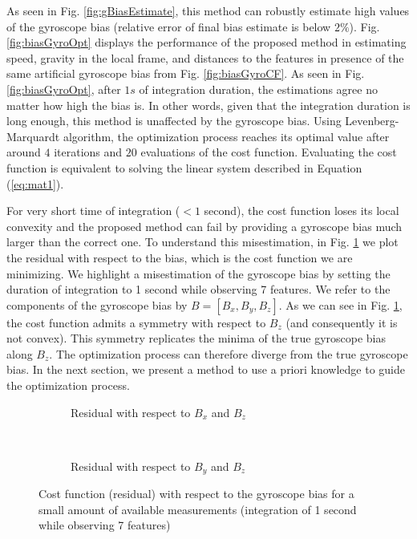 \documentclass[letterpaper, 10 pt, journal, twoside]{IEEEtran}  %
\begin{document}
As seen in Fig. \ref{fig:gBiasEstimate}, this method can robustly estimate high values of the gyroscope bias (relative error of final bias estimate is below $2\%$).
Fig. \ref{fig:biasGyroOpt} displays the performance of the proposed method in estimating speed, gravity in the local frame, and distances to the features in presence of the same artificial gyroscope bias from Fig. \ref{fig:biasGyroCF}.
As seen in Fig. \ref{fig:biasGyroOpt}, after $1s$ of integration duration, the estimations agree no matter how high the bias is.
In other words, given that the integration duration is long enough, this method is unaffected by the gyroscope bias.
Using Levenberg-Marquardt algorithm, the optimization process reaches its optimal value after around $4$ iterations and $20$ evaluations of the cost function.
Evaluating the cost function is equivalent to solving the linear system described in Equation (\ref{eq:mat1}).

\noindent For very short time of integration ($<1$ second), the cost function loses its local convexity and the proposed method can fail by providing a gyroscope bias much larger than the correct one.
To understand this misestimation, in Fig. \ref{fig:cost} we plot the residual with respect to the bias, which is the cost function we are minimizing.
We highlight a misestimation of the gyroscope bias by setting the duration of integration to 1 second while observing 7 features.
We refer to the components of the gyroscope bias by $B = [B_x, B_y, B_z]$.
As we can see in Fig. \ref{fig:cost}, the cost function admits a symmetry with respect to $B_z$ (and consequently it is not convex).
This symmetry replicates the minima of the true gyroscope bias along $B_z$.
The optimization process can therefore diverge from the true gyroscope bias.
In the next section, we present a method to use a priori knowledge to guide the optimization process.

\begin{figure}
        \centering
        \begin{subfigure}[b]{0.489\columnwidth}
                \resizebox{\columnwidth}{!}{}
                \caption{Residual with respect to $B_x$ and $B_z$}
        \end{subfigure}~
        \begin{subfigure}[b]{0.489\columnwidth}
                \resizebox{\columnwidth}{!}{}
                \caption{Residual with respect to $B_y$ and $B_z$}
        \end{subfigure}
        \caption{Cost function (residual) with respect to the gyroscope bias for a small amount of available measurements (integration of 1 second while observing 7 features)\label{fig:cost}}
\end{figure}
\end{document}
